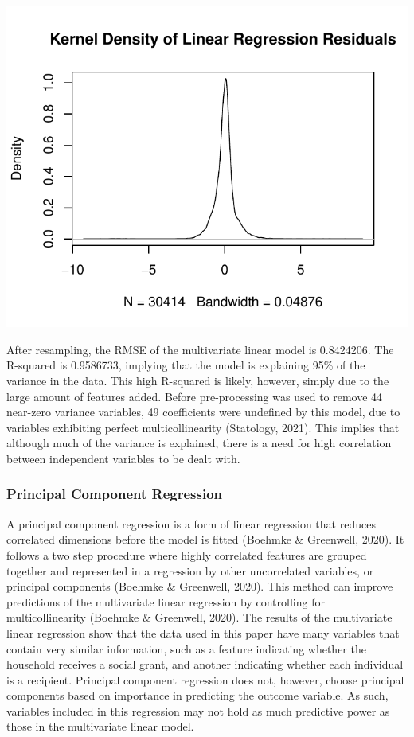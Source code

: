 \documentclass[11pt,preprint, authoryear]{elsarticle}
\numberwithin{equation}{section}
\numberwithin{figure}{section}
\numberwithin{table}{section}
\begin{document}
\begin{center}\includegraphics{MLPDF_files/figure-latex/unnamed-chunk-7-1} \end{center}

After resampling, the RMSE of the multivariate linear model is
0.8424206. The R-squared is 0.9586733, implying that the model is
explaining 95\% of the variance in the data. This high R-squared is
likely, however, simply due to the large amount of features added.
Before pre-processing was used to remove 44 near-zero variance
variables, 49 coefficients were undefined by this model, due to
variables exhibiting perfect multicollinearity (Statology, 2021). This
implies that although much of the variance is explained, there is a need
for high correlation between independent variables to be dealt with.

\hypertarget{principal-component-regression}{%
\subsubsection{Principal Component
Regression}\label{principal-component-regression}}

A principal component regression is a form of linear regression that
reduces correlated dimensions before the model is fitted (Boehmke \&
Greenwell, 2020). It follows a two step procedure where highly
correlated features are grouped together and represented in a regression
by other uncorrelated variables, or principal components (Boehmke \&
Greenwell, 2020). This method can improve predictions of the
multivariate linear regression by controlling for multicollinearity
(Boehmke \& Greenwell, 2020). The results of the multivariate linear
regression show that the data used in this paper have many variables
that contain very similar information, such as a feature indicating
whether the household receives a social grant, and another indicating
whether each individual is a recipient. Principal component regression
does not, however, choose principal components based on importance in
predicting the outcome variable. As such, variables included in this
regression may not hold as much predictive power as those in the
multivariate linear model.
\end{document}
